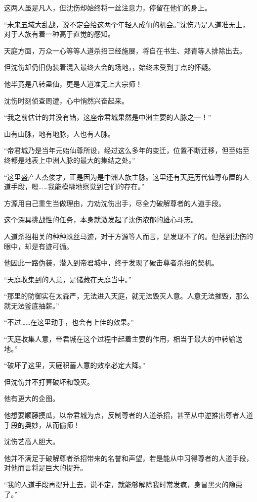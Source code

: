 \begin{this_body}
这两人虽是凡人，但沈伤却始终将一丝注意力，停留在他们的身上。

“未来五域大乱战，说不定会给这两个年轻人成仙的机会。”沈伤乃是人道准无上，对于人族有着一种高于直觉的感知。

天庭方面，万众一心等等人道杀招已经施展，将自在书生、郑青等人排除出去。

但沈伤却仍旧伪装着混入最终大会的场地，，始终未受到丁点的怀疑。

他毕竟是八转蛊仙，更是人道准无上大宗师！

沈伤时刻侦查周遭，心中悄然兴奋起来。

“我之前估计的并没有错，这座帝君城果然是中洲主要的人脉之一！”

山有山脉，地有地脉，人也有人脉。

“帝君城乃是当年元始仙尊所设，经过这么多年的变迁，位置不断迁移，但至始至终都是地表上中洲人脉的最大的集结之处。”

“这里盛产人杰俊才，正是因为是中洲人族主脉。这里还有天庭历代仙尊布置的人道手段，嗯……我能模糊地察觉到它们的存在。”

方源用自己重生当做理由，力劝沈伤出手，尽全力破解尊者的人道手段。

这个深具挑战性的任务，本身就激发起了沈伤浓郁的雄心斗志。

人道杀招相关的种种蛛丝马迹，对于方源等人而言，是发现不了的。但落到沈伤的眼中，却是有迹可循。

他因此一路伪装，潜入到帝君城中，终于发现了破击尊者杀招的契机。

“天庭收集到的人意，是储藏在天庭当中。”

“那里的防御实在太森严，无法进入天庭，就无法毁灭人意。人意无法摧毁，那么就无法釜底抽薪。”

“不过……在这里动手，也会有上佳的效果。”

“天庭收集人意，帝君城在这个过程中起着主要的作用，相当于最大的中转输送地。”

“破坏了这里，天庭积蓄人意的效率必定大降。”

但沈伤并不打算破坏和毁灭。

他有更大的企图。

他想要顺藤摸瓜，以帝君城为点，反制尊者的人道杀招，甚至从中逆推出尊者人道手段的奥妙，从而偷师！

沈伤艺高人胆大。

他并不满足于破解尊者杀招带来的名誉和声望，若是能从中习得尊者的人道手段，对他而言将是巨大的提升。

“我的人道手段再提升上去，说不定，就能够解除我时常发疯，身冒黑火的隐患了。”


\end{this_body}
